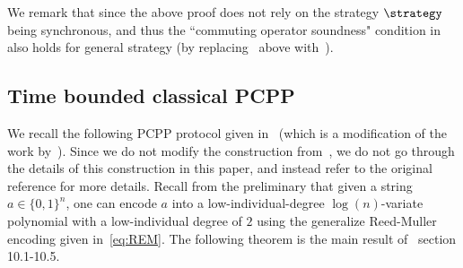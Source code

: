 We remark that since the above proof does not rely on the strategy $\strategy$ being synchronous, and thus the ``commuting operator soundness" condition in~ also holds for general strategy (by replacing~ above with~\cite[Corollary 4.4]{linTracialEmbeddableStrategies2024}). 





\subsection{Time bounded classical PCPP}


We recall the following PCPP protocol given in~\cite[Section 10]{jiMIPRE2022a} (which is a modification of the work by~\cite{harshaRobustPCPsProximity2004}). Since we do not modify the construction from~\cite{jiMIPRE2022a}, we do not go through the details of this construction in this paper, and instead refer to the original reference for more details. Recall from the preliminary that given a string $a \in \{0,1\}^n$, one can encode $a$ into a low-individual-degree $\log(n)$-variate polynomial with a low-individual degree of $2$ using the generalize Reed-Muller encoding given in~\eqref{eq:REM}. The following theorem is the main result of~\cite{jiMIPRE2022a} section 10.1-10.5.

